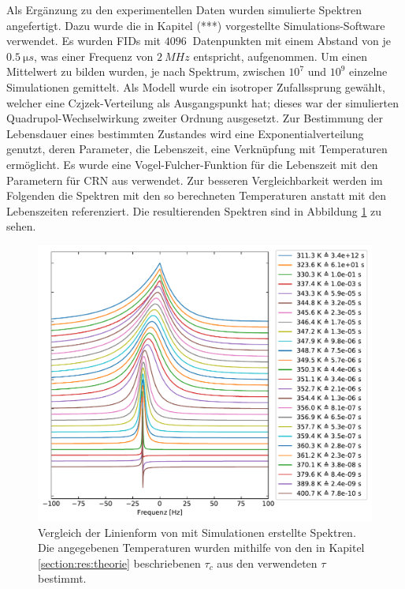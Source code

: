 Als Ergänzung zu den experimentellen Daten wurden simulierte Spektren angefertigt. Dazu wurde die in Kapitel (***) vorgestellte Simulations-Software verwendet. Es wurden FIDs mit $\SI{4096}{}$ Datenpunkten mit einem Abstand von je $\SI{0.5}{\micro s}$, was einer Frequenz von $\SI{2}{MHz}$ entspricht, aufgenommen. Um einen Mittelwert zu bilden wurden, je nach Spektrum, zwischen $10^{7}$ und $10^{9}$ einzelne Simulationen gemittelt. Als Modell wurde ein isotroper Zufallssprung gewählt, welcher eine Czjzek-Verteilung als Ausgangspunkt hat; dieses war der simulierten Quadrupol-Wechselwirkung zweiter Ordnung ausgesetzt. Zur Bestimmung der Lebensdauer eines bestimmten Zustandes wird eine Exponentialverteilung genutzt, deren Parameter, die Lebenszeit, eine Verknüpfung mit Temperaturen ermöglicht. Es wurde eine Vogel-Fulcher-Funktion für die Lebenszeit mit den Parametern für CRN aus \cite{PIMENOV199793} verwendet. Zur besseren Vergleichbarkeit werden im Folgenden die Spektren mit den so berechneten Temperaturen anstatt mit den Lebenszeiten referenziert. Die resultierenden Spektren sind in Abbildung \ref{fig:res:sim_linienform} zu sehen.
\begin{figure}
	\begin{center}
		\includegraphics[width=\textwidth]{graphics/plot/sim_lineshape.pdf}
	\end{center}
	\caption{Vergleich der Linienform von mit Simulationen erstellte Spektren. Die angegebenen Temperaturen wurden mithilfe von den in Kapitel \ref{section:res:theorie} beschriebenen $\tau_c$ aus den verwendeten $\tau$ bestimmt.} \label{fig:res:sim_linienform}
\end{figure}

